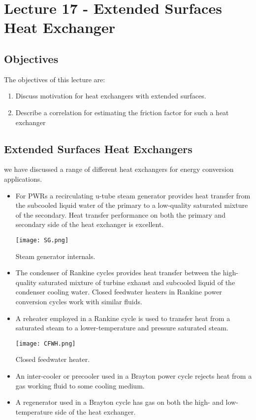 \chapter{Lecture 17 - Extended Surfaces Heat Exchanger}
\label{ch:ch17}
\section{Objectives}
The objectives of this lecture are:
\begin{enumerate}
\item Discuss motivation for heat exchangers with extended surfaces.
\item Describe a correlation for estimating the friction factor for such a heat exchanger
\end{enumerate}

\section{Extended Surfaces Heat Exchangers}
 we have discussed a range of different heat exchangers for energy conversion applications.  

\begin{itemize}
\item For PWRs a recirculating u-tube steam generator provides heat transfer from the subcooled liquid water of the primary to a low-quality saturated mixture of the secondary.  Heat transfer performance on both the primary and secondary side of the heat exchanger is excellent.

\begin{marginfigure}
\texttt{[image: SG.png]}
\caption{Steam generator internals.}
\label{fig:SG}
\end{marginfigure}

\item The condenser of Rankine cycles provides heat transfer between the high-quality saturated mixture of turbine exhaust and subcooled liquid of the condenser cooling water.  Closed feedwater heaters in Rankine power conversion cycles work with similar fluids.

\item A reheater employed in a Rankine cycle is used to transfer heat from a saturated steam to a lower-temperature and pressure saturated steam.  

\begin{marginfigure}
\texttt{[image: CFWH.png]}
\caption{Closed feedwater heater.}
\label{fig:CFWH}
\end{marginfigure}

\item An inter-cooler or precooler used in a Brayton power cycle rejects heat from a gas working fluid to some cooling medium.  

\item A regenerator used in a Brayton cycle has gas on both the high- and low-temperature side of the heat exchanger.  
\end{itemize}

